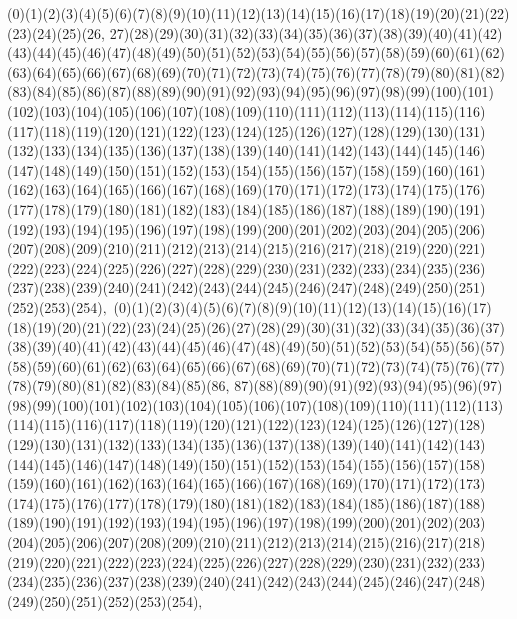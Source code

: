\documentclass[12pt]{article}
\begin{document}
{(0)(1)(2)(3)(4)(5)(6)(7)(8)(9)(10)(11)(12)(13)(14)(15)(16)(17)(18)(19)(20)(21)(22)(23)(24)(25)(26, 27)(28)(29)(30)(31)(32)(33)(34)(35)(36)(37)(38)(39)(40)(41)(42)(43)(44)(45)(46)(47)(48)(49)(50)(51)(52)(53)(54)(55)(56)(57)(58)(59)(60)(61)(62)(63)(64)(65)(66)(67)(68)(69)(70)(71)(72)(73)(74)(75)(76)(77)(78)(79)(80)(81)(82)(83)(84)(85)(86)(87)(88)(89)(90)(91)(92)(93)(94)(95)(96)(97)(98)(99)(100)(101)(102)(103)(104)(105)(106)(107)(108)(109)(110)(111)(112)(113)(114)(115)(116)(117)(118)(119)(120)(121)(122)(123)(124)(125)(126)(127)(128)(129)(130)(131)(132)(133)(134)(135)(136)(137)(138)(139)(140)(141)(142)(143)(144)(145)(146)(147)(148)(149)(150)(151)(152)(153)(154)(155)(156)(157)(158)(159)(160)(161)(162)(163)(164)(165)(166)(167)(168)(169)(170)(171)(172)(173)(174)(175)(176)(177)(178)(179)(180)(181)(182)(183)(184)(185)(186)(187)(188)(189)(190)(191)(192)(193)(194)(195)(196)(197)(198)(199)(200)(201)(202)(203)(204)(205)(206)(207)(208)(209)(210)(211)(212)(213)(214)(215)(216)(217)(218)(219)(220)(221)(222)(223)(224)(225)(226)(227)(228)(229)(230)(231)(232)(233)(234)(235)(236)(237)(238)(239)(240)(241)(242)(243)(244)(245)(246)(247)(248)(249)(250)(251)(252)(253)(254)$
, 
$
(0)(1)(2)(3)(4)(5)(6)(7)(8)(9)(10)(11)(12)(13)(14)(15)(16)(17)(18)(19)(20)(21)(22)(23)(24)(25)(26)(27)(28)(29)(30)(31)(32)(33)(34)(35)(36)(37)(38)(39)(40)(41)(42)(43)(44)(45)(46)(47)(48)(49)(50)(51)(52)(53)(54)(55)(56)(57)(58)(59)(60)(61)(62)(63)(64)(65)(66)(67)(68)(69)(70)(71)(72)(73)(74)(75)(76)(77)(78)(79)(80)(81)(82)(83)(84)(85)(86, 87)(88)(89)(90)(91)(92)(93)(94)(95)(96)(97)(98)(99)(100)(101)(102)(103)(104)(105)(106)(107)(108)(109)(110)(111)(112)(113)(114)(115)(116)(117)(118)(119)(120)(121)(122)(123)(124)(125)(126)(127)(128)(129)(130)(131)(132)(133)(134)(135)(136)(137)(138)(139)(140)(141)(142)(143)(144)(145)(146)(147)(148)(149)(150)(151)(152)(153)(154)(155)(156)(157)(158)(159)(160)(161)(162)(163)(164)(165)(166)(167)(168)(169)(170)(171)(172)(173)(174)(175)(176)(177)(178)(179)(180)(181)(182)(183)(184)(185)(186)(187)(188)(189)(190)(191)(192)(193)(194)(195)(196)(197)(198)(199)(200)(201)(202)(203)(204)(205)(206)(207)(208)(209)(210)(211)(212)(213)(214)(215)(216)(217)(218)(219)(220)(221)(222)(223)(224)(225)(226)(227)(228)(229)(230)(231)(232)(233)(234)(235)(236)(237)(238)(239)(240)(241)(242)(243)(244)(245)(246)(247)(248)(249)(250)(251)(252)(253)(254)$
, 
$
}
\end{document}
